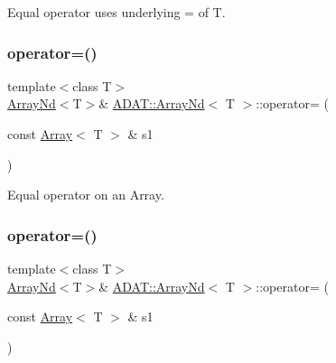 Equal operator uses underlying = of T. 

\mbox{\label{classADAT_1_1ArrayNd_a3290ebbe75b40ebde8f3506f2aea64a5}} 
\subsubsection{\texorpdfstring{operator=()}{operator=()}\hspace{0.1cm}{\footnotesize\ttfamily [3/10]}}
{\footnotesize\ttfamily template$<$class T$>$ \\
\mbox{\hyperlink{classADAT_1_1ArrayNd}{Array\+Nd}}$<$T$>$\& \mbox{\hyperlink{classADAT_1_1ArrayNd}{A\+D\+A\+T\+::\+Array\+Nd}}$<$ T $>$\+::operator= (\begin{DoxyParamCaption}\item[{const \mbox{\hyperlink{classXMLArray_1_1Array}{Array}}$<$ T $>$ \&}]{s1 }\end{DoxyParamCaption})\hspace{0.3cm}{\ttfamily [inline]}}



Equal operator on an Array. 

\mbox{\label{classADAT_1_1ArrayNd_a3290ebbe75b40ebde8f3506f2aea64a5}} 
\subsubsection{\texorpdfstring{operator=()}{operator=()}\hspace{0.1cm}{\footnotesize\ttfamily [4/10]}}
{\footnotesize\ttfamily template$<$class T$>$ \\
\mbox{\hyperlink{classADAT_1_1ArrayNd}{Array\+Nd}}$<$T$>$\& \mbox{\hyperlink{classADAT_1_1ArrayNd}{A\+D\+A\+T\+::\+Array\+Nd}}$<$ T $>$\+::operator= (\begin{DoxyParamCaption}\item[{const \mbox{\hyperlink{classXMLArray_1_1Array}{Array}}$<$ T $>$ \&}]{s1 }\end{DoxyParamCaption})\hspace{0.3cm}{\ttfamily [inline]}}



